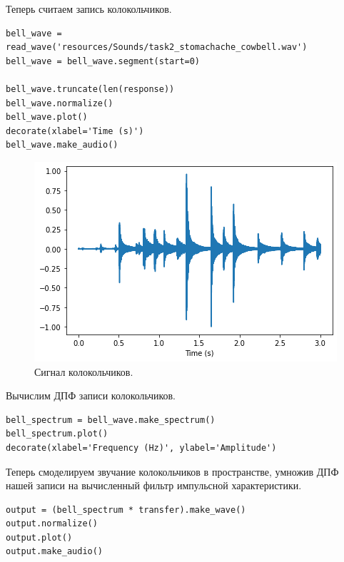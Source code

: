 \documentclass[a4paper, 14pt]{extarticle}
\begin{document}
    Теперь считаем запись колокольчиков.

    \begin{lstlisting}[caption= Чтение записи колокольчиков., label={lst:task2_bell_wave}]
bell_wave = read_wave('resources/Sounds/task2_stomachache_cowbell.wav')
bell_wave = bell_wave.segment(start=0)

bell_wave.truncate(len(response))
bell_wave.normalize()
bell_wave.plot()
decorate(xlabel='Time (s)')
bell_wave.make_audio()      \end{lstlisting}

    \begin{figure}[h]
        \centering
        \includegraphics[width=0.8\linewidth]{resources/Images/task2_bell_wave}
        \caption{Сигнал колокольчиков.}
        \label{fig:task2_bell_wave}
    \end{figure}

    Вычислим ДПФ записи колокольчиков.

    \begin{lstlisting}[caption= Получение ДПФ записи колокольчиков., label={lst:task2_bell_spectrum}]
bell_spectrum = bell_wave.make_spectrum()
bell_spectrum.plot()
decorate(xlabel='Frequency (Hz)', ylabel='Amplitude')   \end{lstlisting}

    Теперь смоделируем звучание колокольчиков в пространстве, умножив ДПФ нашей записи на вычисленный фильтр импульсной
    характеристики.

    \begin{lstlisting}[caption= Умножение ДПФ записи на фильтр., label={lst:task2_bell_result}]
output = (bell_spectrum * transfer).make_wave()
output.normalize()
output.plot()
output.make_audio()     \end{lstlisting}
\end{document}
